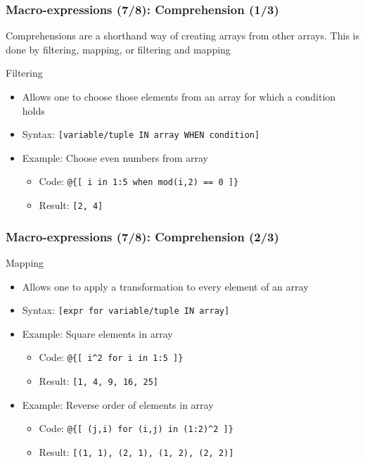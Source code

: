 \documentclass{beamer}
\begin{document}
\begin{frame}[fragile=singleslide]
  \frametitle{Macro-expressions (7/8): Comprehension (1/3)}
  Comprehensions are a shorthand way of creating arrays from other arrays. This is done by filtering, mapping, or filtering and mapping
  \begin{block}{Filtering}
    \begin{itemize}
    \item Allows one to choose those elements from an array for which a condition holds
    \item Syntax: \texttt{[variable/tuple IN array WHEN condition]}
    \item Example: Choose even numbers from array
      \begin{itemize}
      \item Code: \texttt{@\{[ i in 1:5 when mod(i,2) == 0 ]\}}
      \item Result: \texttt{[2, 4]}
      \end{itemize}
    \end{itemize}
  \end{block}
\end{frame}

\begin{frame}[fragile=singleslide]
  \frametitle{Macro-expressions (7/8): Comprehension (2/3)}
  \begin{block}{Mapping}
    \begin{itemize}
    \item Allows one to apply a transformation to every element of an array
    \item Syntax: \texttt{[expr for variable/tuple IN array]}
    \item Example: Square elements in array
      \begin{itemize}
      \item Code: \texttt{@\{[ i\^{}2 for i in 1:5 ]\}}
      \item Result: \texttt{[1, 4, 9, 16, 25]}
      \end{itemize}
    \item Example: Reverse order of elements in array
      \begin{itemize}
      \item Code: \texttt{@\{[ (j,i) for (i,j) in (1:2)\^{}2 ]\}}
      \item Result: \texttt{[(1, 1), (2, 1), (1, 2), (2, 2)]}
      \end{itemize}
    \end{itemize}
  \end{block}
\end{frame}
\end{document}
